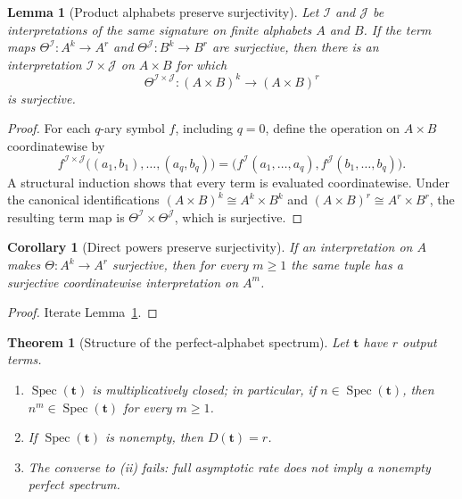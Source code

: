 \documentclass[11pt]{article}
\theoremstyle{definition}
\theoremstyle{plain}
\newtheorem{theorem}[definition]{Theorem}
\newtheorem{lemma}[definition]{Lemma}
\newtheorem{corollary}[definition]{Corollary}
\newcommand{\PerfSpec}{\operatorname{Spec}}
\begin{document}
\begin{lemma}[Product alphabets preserve surjectivity]
\label{lem:product-surjectivity}
Let $\mathcal I$ and $\mathcal J$ be interpretations of the same signature on finite alphabets $A$ and $B$.
If the term maps $\Theta^{\mathcal I}:A^k\to A^r$ and
$\Theta^{\mathcal J}:B^k\to B^r$ are surjective, then there is an interpretation
$\mathcal I\times\mathcal J$ on $A\times B$ for which
\[
\Theta^{\mathcal I\times\mathcal J}:(A\times B)^k\longrightarrow(A\times B)^r
\]
is surjective.
\end{lemma}

\begin{proof}
For each $q$-ary symbol $f$, including $q=0$, define the operation on $A\times B$ coordinatewise by
\[
f^{\mathcal I\times\mathcal J}
  \bigl((a_1,b_1),\ldots,(a_q,b_q)\bigr)
=
\bigl(f^{\mathcal I}(a_1,\ldots,a_q),f^{\mathcal J}(b_1,\ldots,b_q)\bigr).
\]
A structural induction shows that every term is evaluated coordinatewise.  Under the canonical identifications
$(A\times B)^k\cong A^k\times B^k$ and $(A\times B)^r\cong A^r\times B^r$, the resulting term map is
$\Theta^{\mathcal I}\times\Theta^{\mathcal J}$, which is surjective.
\end{proof}

\begin{corollary}[Direct powers preserve surjectivity]
\label{lem:direct-power}
If an interpretation on $A$ makes $\Theta:A^k\to A^r$ surjective, then for every $m\ge1$ the same tuple has a
surjective coordinatewise interpretation on $A^m$.
\end{corollary}

\begin{proof}
Iterate Lemma~\ref{lem:product-surjectivity}.
\end{proof}

\begin{theorem}[Structure of the perfect-alphabet spectrum]
\label{thm:perfect-spectrum-structure}
Let $\mathbf t$ have $r$ output terms.
\begin{enumerate}[label=\textit{(\roman*)}, leftmargin=*]
\item $\PerfSpec(\mathbf t)$ is multiplicatively closed; in particular, if $n\in\PerfSpec(\mathbf t)$, then
      $n^m\in\PerfSpec(\mathbf t)$ for every $m\ge1$.
\item If $\PerfSpec(\mathbf t)$ is nonempty, then $D(\mathbf t)=r$.
\item The converse to \textit{(ii)} fails: full asymptotic rate does not imply a nonempty perfect spectrum.
\end{enumerate}
\end{theorem}
\end{document}
